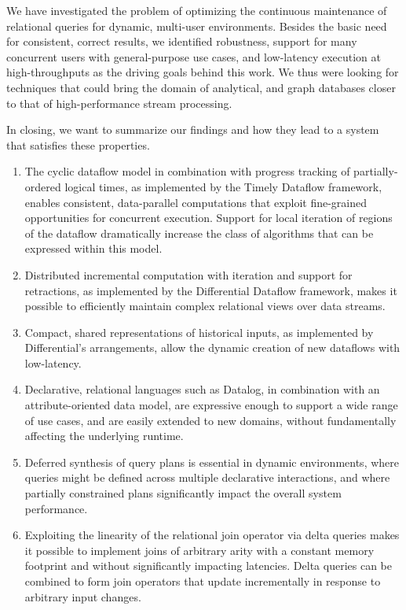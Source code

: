 \documentclass{article}
\begin{document}
We have investigated the problem of optimizing the continuous
maintenance of relational queries for dynamic, multi-user
environments. Besides the basic need for consistent, correct results,
we identified robustness, support for many concurrent users with
general-purpose use cases, and low-latency execution at
high-throughputs as the driving goals behind this work. We thus were
looking for techniques that could bring the domain of analytical, and
graph databases closer to that of high-performance stream processing.

In closing, we want to summarize our findings and how they lead to a
system that satisfies these properties.

\begin{enumerate}
\item
  The cyclic dataflow model in combination with progress tracking of
  partially-ordered logical times, as implemented by the Timely
  Dataflow framework, enables consistent, data-parallel computations
  that exploit fine-grained opportunities for concurrent
  execution. Support for local iteration of regions of the dataflow
  dramatically increase the class of algorithms that can be expressed
  within this model.

\item
  Distributed incremental computation with iteration and support for
  retractions, as implemented by the Differential Dataflow framework,
  makes it possible to efficiently maintain complex relational views
  over data streams.

\item
  Compact, shared representations of historical inputs, as implemented
  by Differential's arrangements, allow the dynamic creation of new
  dataflows with low-latency.

\item
  Declarative, relational languages such as Datalog, in combination
  with an attribute-oriented data model, are expressive enough to
  support a wide range of use cases, and are easily extended to new
  domains, without fundamentally affecting the underlying runtime.

\item
  Deferred synthesis of query plans is essential in dynamic
  environments, where queries might be defined across multiple
  declarative interactions, and where partially constrained plans
  significantly impact the overall system performance.

\item
  Exploiting the linearity of the relational join operator via delta
  queries makes it possible to implement joins of arbitrary arity with
  a constant memory footprint and without significantly impacting
  latencies. Delta queries can be combined to form join operators that
  update incrementally in response to arbitrary input changes.


\end{enumerate}
\end{document}
